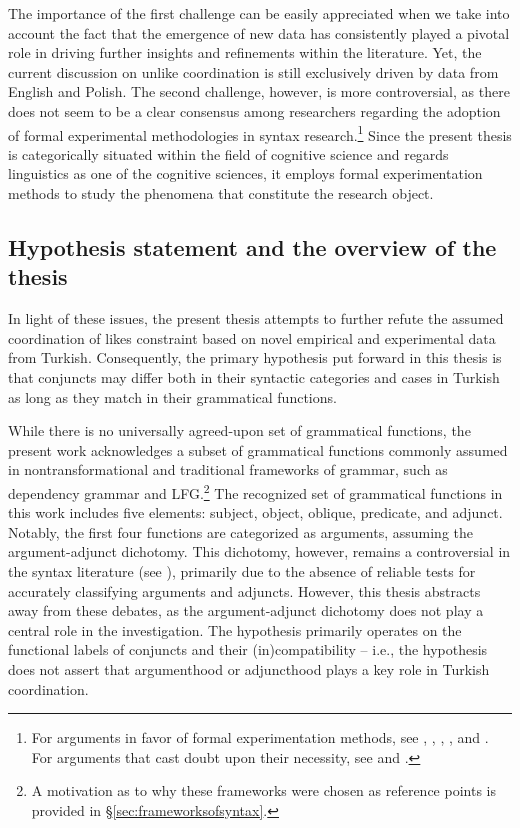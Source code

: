 The importance of the first challenge can be easily appreciated when we take into account the fact that the emergence of new data has consistently played a pivotal role in driving further insights and refinements within the literature.  Yet, the current discussion on unlike coordination is still exclusively driven by data from English and Polish. The second challenge, however, is more controversial, as there does not seem to be a clear consensus among researchers regarding the adoption of formal experimental methodologies in syntax research.\footnote{For arguments in favor of formal experimentation methods, see \citet{Schutze1996}, \citet{cowart1997}, \citet{WASOW2005}, \citet{gibsonetal13}, and \citet{HitzFrancis+2016}. For arguments that cast doubt upon their necessity, see \citet{phillips2009should} and \citet{SPROUSE2013}.} Since the present thesis is categorically situated within the field of cognitive science and regards linguistics as one of the cognitive sciences, it employs formal experimentation methods to study the phenomena that constitute the research object.

\subsection{Hypothesis statement and the overview of the thesis}
In light of these issues, the present thesis attempts to further refute the assumed coordination of likes constraint based on novel empirical and experimental data from Turkish. Consequently, the primary hypothesis put forward in this thesis is that conjuncts may differ both in their syntactic categories and cases in Turkish as long as they match in their grammatical functions. 

\begin{sloppypar}
While there is no universally agreed-upon set of grammatical functions, the present work acknowledges a subset of grammatical functions commonly assumed in nontransformational and traditional frameworks of grammar, such as dependency grammar \citep{tesniere:59} and LFG.\footnote{A motivation as to why these frameworks were chosen as reference points is provided in \S \ref{sec:frameworksofsyntax}.} The recognized set of grammatical functions in this work includes five elements: subject, object, oblique, predicate, and adjunct. Notably, the first four functions are categorized as arguments, assuming the argument-adjunct dichotomy.  This dichotomy, however, remains a controversial in the syntax literature (see \citealt{Vater1978, Haspelmath2014, prze:16}), primarily due to the absence of reliable tests for accurately classifying arguments and adjuncts. However, this thesis abstracts away from these debates, as the argument-adjunct dichotomy does not play a central role in the investigation. The hypothesis primarily operates on the functional labels of conjuncts and their (in)compatibility -- i.e., the hypothesis does not assert that argumenthood or adjuncthood plays a key role in Turkish coordination.
\end{sloppypar}

